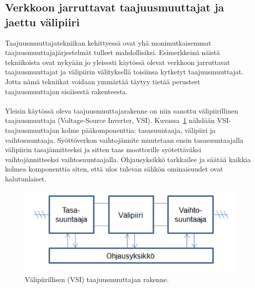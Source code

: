 \documentclass[finnish,12pt,a4paper,pdftex,elec,utf8]{aaltothesis}
\begin{document}






\subsection{Verkkoon jarruttavat taajuusmuuttajat ja jaettu välipiiri}
Taajuusmuuttajatekniikan kehittyessä ovat yhä monimutkaisemmat taajuusmuuttajajärjestelmät tulleet mahdollisiksi. Esimerkkeinä näistä tekniikoista ovat nykyään jo yleisesti käytössä olevat verkkoon jarruttavat taajuusmuuttajat ja välipiirin välityksellä toisiinsa kytketyt taajuusmuuttajat. Jotta nämä tekniikat voidaan ymmärtää täytyy tietää perusteet taajuusmuuttajan sisäisestä rakenteesta.
\\\\
Yleisin käytössä oleva taajuusmuuttajarakenne on niin sanottu välipiirillinen taajuusmuuttaja (Voltage-Source Inverter, VSI). Kuvassa~\ref{fig:VSI} nähdään VSI-taajuusmuuttajan kolme pääkomponenttia: tasasuuntaaja, välipiiri ja vaihtosuuntaaja. Syöttöverkon vaihtojännite muutetaan ensin tasasuuntaajalla välipiirin tasajännitteeksi ja sitten taas moottorille syötettäväksi vaihtojännitteeksi vaihtosuuntaajalla. Ohjausyksikkö tarkkailee ja säätää kaikkia kolmea komponenttia siten, että ulos tulevan sähkön ominaisuudet ovat halutunlaiset.

\begin{figure}[H]
	\begin{center}
	\includegraphics[scale=0.65]{VSI}
	\end{center}
	\caption{Välipiirillisen (VSI) taajuusmuuttajan rakenne.
		 \cite[s. 2]{VSI}}
	\label{fig:VSI}
\end{figure}
\end{document}
